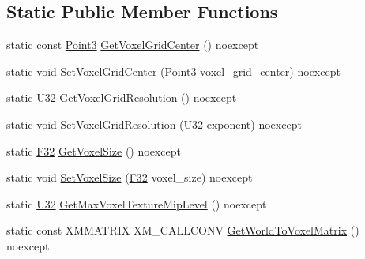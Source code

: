 \subsection*{Static Public Member Functions}
\begin{DoxyCompactItemize}
\item 
static const \mbox{\hyperlink{structmage_1_1_point3}{Point3}} \mbox{\hyperlink{classmage_1_1rendering_1_1_voxelization_settings_a3607b62516e690c192d356b59375ba18}{Get\+Voxel\+Grid\+Center}} () noexcept
\item 
static void \mbox{\hyperlink{classmage_1_1rendering_1_1_voxelization_settings_ad4a2dd741cdd4187eaaa2492fb1ca533}{Set\+Voxel\+Grid\+Center}} (\mbox{\hyperlink{structmage_1_1_point3}{Point3}} voxel\+\_\+grid\+\_\+center) noexcept
\item 
static \mbox{\hyperlink{namespacemage_a41c104c036fba3756a74e19f793eeaa1}{U32}} \mbox{\hyperlink{classmage_1_1rendering_1_1_voxelization_settings_a81a186bbca9250f2021fb4bbeff6f831}{Get\+Voxel\+Grid\+Resolution}} () noexcept
\item 
static void \mbox{\hyperlink{classmage_1_1rendering_1_1_voxelization_settings_aeffbe093b1df8a738906db2249961ed8}{Set\+Voxel\+Grid\+Resolution}} (\mbox{\hyperlink{namespacemage_a41c104c036fba3756a74e19f793eeaa1}{U32}} exponent) noexcept
\item 
static \mbox{\hyperlink{namespacemage_aa97e833b45f06d60a0a9c4fc22ae02c0}{F32}} \mbox{\hyperlink{classmage_1_1rendering_1_1_voxelization_settings_ae9c6e798bef7bbbb3031026eccbe6873}{Get\+Voxel\+Size}} () noexcept
\item 
static void \mbox{\hyperlink{classmage_1_1rendering_1_1_voxelization_settings_a4e1c575474a1301981bc0a0070c2c841}{Set\+Voxel\+Size}} (\mbox{\hyperlink{namespacemage_aa97e833b45f06d60a0a9c4fc22ae02c0}{F32}} voxel\+\_\+size) noexcept
\item 
static \mbox{\hyperlink{namespacemage_a41c104c036fba3756a74e19f793eeaa1}{U32}} \mbox{\hyperlink{classmage_1_1rendering_1_1_voxelization_settings_aacf64e0e4be2e7260793dfefe7f332cb}{Get\+Max\+Voxel\+Texture\+Mip\+Level}} () noexcept
\item 
static const X\+M\+M\+A\+T\+R\+IX X\+M\+\_\+\+C\+A\+L\+L\+C\+O\+NV \mbox{\hyperlink{classmage_1_1rendering_1_1_voxelization_settings_ac0eb16df3bfae7218b27e1c1cdf1399f}{Get\+World\+To\+Voxel\+Matrix}} () noexcept
\end{DoxyCompactItemize}
